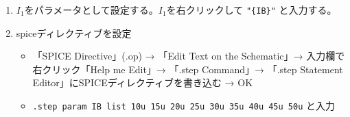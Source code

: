 \begin{enumerate}
  \setlength{\parskip}{0cm} %
  \setlength{\itemsep}{0cm} %
  \item $I_1$をパラメータとして設定する。$I_1$を右クリックして \verb|"{IB}"| と入力する。
  \item spiceディレクティブを設定
    \begin{itemize}
      \setlength{\parskip}{0cm} %
      \setlength{\itemsep}{0cm} %
      \item 「SPICE Directive」(.op) → 「Edit Text on the Schematic」→ 入力欄で右クリック「Help me Edit」→ 「.step Command」→ 「.step Statement Editor」にSPICEディレクティブを書き込む → OK
      \item \verb|.step param IB list 10u 15u 20u 25u 30u 35u 40u 45u 50u| と入力

    \begin{figure}[htb]
      \begin{center}


\end{center}
\end{figure}
\end{itemize}
\end{enumerate}
